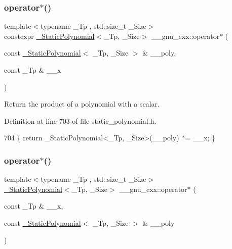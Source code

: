 \subsubsection{\texorpdfstring{operator$\ast$()}{operator*()}\hspace{0.1cm}{\footnotesize\ttfamily [1/6]}}
{\footnotesize\ttfamily template$<$typename \+\_\+\+Tp , std\+::size\+\_\+t \+\_\+\+Size$>$ \\
constexpr \hyperlink{class____gnu__cxx_1_1__StaticPolynomial}{\+\_\+\+Static\+Polynomial}$<$\+\_\+\+Tp, \+\_\+\+Size$>$ \+\_\+\+\_\+gnu\+\_\+cxx\+::operator$\ast$ (\begin{DoxyParamCaption}\item[{const \hyperlink{class____gnu__cxx_1_1__StaticPolynomial}{\+\_\+\+Static\+Polynomial}$<$ \+\_\+\+Tp, \+\_\+\+Size $>$ \&}]{\+\_\+\+\_\+poly,  }\item[{const \+\_\+\+Tp \&}]{\+\_\+\+\_\+x }\end{DoxyParamCaption})\hspace{0.3cm}{\ttfamily [inline]}}

Return the product of a polynomial with a scalar. 

Definition at line 703 of file static\+\_\+polynomial.\+h.


\begin{DoxyCode}
704     \{ \textcolor{keywordflow}{return} \_StaticPolynomial<\_Tp, \_Size>(\_\_poly) *= \_\_x; \}
\end{DoxyCode}
\mbox{\label{namespace____gnu__cxx_a91cea4290bb3218fc6d869a655db5891}} 
\subsubsection{\texorpdfstring{operator$\ast$()}{operator*()}\hspace{0.1cm}{\footnotesize\ttfamily [2/6]}}
{\footnotesize\ttfamily template$<$typename \+\_\+\+Tp , std\+::size\+\_\+t \+\_\+\+Size$>$ \\
\hyperlink{class____gnu__cxx_1_1__StaticPolynomial}{\+\_\+\+Static\+Polynomial}$<$\+\_\+\+Tp, \+\_\+\+Size$>$ \+\_\+\+\_\+gnu\+\_\+cxx\+::operator$\ast$ (\begin{DoxyParamCaption}\item[{const \+\_\+\+Tp \&}]{\+\_\+\+\_\+x,  }\item[{const \hyperlink{class____gnu__cxx_1_1__StaticPolynomial}{\+\_\+\+Static\+Polynomial}$<$ \+\_\+\+Tp, \+\_\+\+Size $>$ \&}]{\+\_\+\+\_\+poly }\end{DoxyParamCaption})\hspace{0.3cm}{\ttfamily [inline]}}



